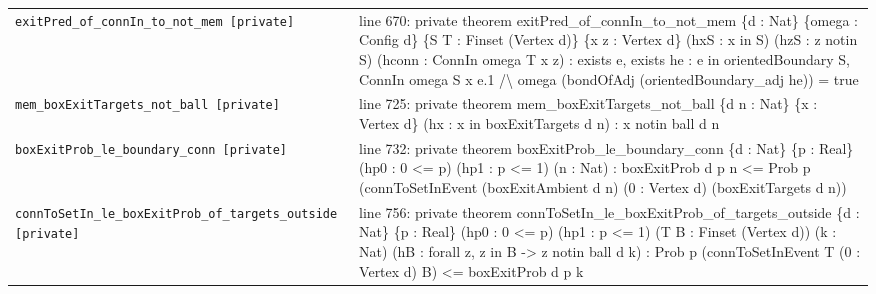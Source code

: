 \documentclass[10pt]{article}
\begin{document}
\begin{longtable}{>{\raggedright\arraybackslash}p{} >{\raggedright\arraybackslash}p{}}
\texttt{exitPred\_\allowbreak{}of\_\allowbreak{}connIn\_\allowbreak{}to\_\allowbreak{}not\_\allowbreak{}mem [private]} & {\ttfamily\scriptsize line 670:\allowbreak{} private theorem exitPred\_\allowbreak{}of\_\allowbreak{}connIn\_\allowbreak{}to\_\allowbreak{}not\_\allowbreak{}mem \{d :\allowbreak{} Nat\} \{omega :\allowbreak{} Config d\} \{S T :\allowbreak{} Finset (\allowbreak{}Vertex d)\allowbreak{}\} \{x z :\allowbreak{} Vertex d\} (\allowbreak{}hxS :\allowbreak{} x in S)\allowbreak{} (\allowbreak{}hzS :\allowbreak{} z notin S)\allowbreak{} (\allowbreak{}hconn :\allowbreak{} ConnIn omega T x z)\allowbreak{} :\allowbreak{} exists e,\allowbreak{} exists he :\allowbreak{} e in orientedBoundary S,\allowbreak{} ConnIn omega S x e.\allowbreak{}1 /\allowbreak{}\textbackslash{} omega (\allowbreak{}bondOfAdj (\allowbreak{}orientedBoundary\_\allowbreak{}adj he)\allowbreak{})\allowbreak{} =\allowbreak{} true} \\[0.45em]
\texttt{mem\_\allowbreak{}boxExitTargets\_\allowbreak{}not\_\allowbreak{}ball [private]} & {\ttfamily\scriptsize line 725:\allowbreak{} private theorem mem\_\allowbreak{}boxExitTargets\_\allowbreak{}not\_\allowbreak{}ball \{d n :\allowbreak{} Nat\} \{x :\allowbreak{} Vertex d\} (\allowbreak{}hx :\allowbreak{} x in boxExitTargets d n)\allowbreak{} :\allowbreak{} x notin ball d n} \\[0.45em]
\texttt{boxExitProb\_\allowbreak{}le\_\allowbreak{}boundary\_\allowbreak{}conn [private]} & {\ttfamily\scriptsize line 732:\allowbreak{} private theorem boxExitProb\_\allowbreak{}le\_\allowbreak{}boundary\_\allowbreak{}conn \{d :\allowbreak{} Nat\} \{p :\allowbreak{} Real\} (\allowbreak{}hp0 :\allowbreak{} 0 <=\allowbreak{} p)\allowbreak{} (\allowbreak{}hp1 :\allowbreak{} p <=\allowbreak{} 1)\allowbreak{} (\allowbreak{}n :\allowbreak{} Nat)\allowbreak{} :\allowbreak{} boxExitProb d p n <=\allowbreak{} Prob p (\allowbreak{}connToSetInEvent (\allowbreak{}boxExitAmbient d n)\allowbreak{} (\allowbreak{}0 :\allowbreak{} Vertex d)\allowbreak{} (\allowbreak{}boxExitTargets d n)\allowbreak{})\allowbreak{}} \\[0.45em]
\texttt{connToSetIn\_\allowbreak{}le\_\allowbreak{}boxExitProb\_\allowbreak{}of\_\allowbreak{}targets\_\allowbreak{}outside [private]} & {\ttfamily\scriptsize line 756:\allowbreak{} private theorem connToSetIn\_\allowbreak{}le\_\allowbreak{}boxExitProb\_\allowbreak{}of\_\allowbreak{}targets\_\allowbreak{}outside \{d :\allowbreak{} Nat\} \{p :\allowbreak{} Real\} (\allowbreak{}hp0 :\allowbreak{} 0 <=\allowbreak{} p)\allowbreak{} (\allowbreak{}hp1 :\allowbreak{} p <=\allowbreak{} 1)\allowbreak{} (\allowbreak{}T B :\allowbreak{} Finset (\allowbreak{}Vertex d)\allowbreak{})\allowbreak{} (\allowbreak{}k :\allowbreak{} Nat)\allowbreak{} (\allowbreak{}hB :\allowbreak{} forall z,\allowbreak{} z in B -\allowbreak{}> z notin ball d k)\allowbreak{} :\allowbreak{} Prob p (\allowbreak{}connToSetInEvent T (\allowbreak{}0 :\allowbreak{} Vertex d)\allowbreak{} B)\allowbreak{} <=\allowbreak{} boxExitProb d p k} \\[0.45em]

\end{longtable}
\end{document}
